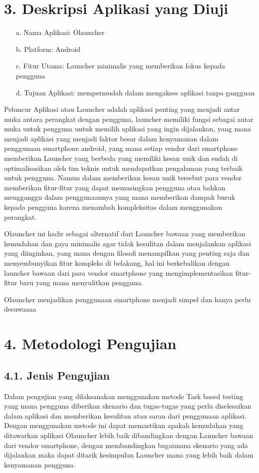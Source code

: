 \section*{3. Deskripsi Aplikasi yang Diuji}

\begin{itemize}[leftmargin=*]
\item[a.] Nama Aplikasi: Olauncher
\item[b.] Platform: Android
\item[c.] Fitur Utama: Launcher minimalis yang memberikan fokus kepada pengguna
\item[d.] Tujuan Aplikasi: mempermudah dalam mengakses aplikasi tanpa gangguan
\end{itemize}

Peluncur Aplikasi atau Launcher adalah aplikasi penting yang menjadi antar muka antara perangkat dengan pengguna, launcher memiliki fungsi sebagai antar muka untuk pengguna untuk memilih aplikasi yang ingin dijalankan, yang mana menjadi aplikasi yang menjadi faktor besar dalam kenyamanan dalam penggunaan smartphone android, yang mana setiap vendor dari smartphone memberikan Launcher yang berbeda yang memiliki kesan unik dan sudah di optimalisasikan oleh tim teknis untuk mendapatkan pengalaman yang terbaik untuk pengguna. Namun dalam memberikan kesan unik tersebut para vendor memberikan fitur-fitur yang dapat memusingkan pengguna atau bahkan mengganggu dalam penggunaannya yang mana memberikan dampak buruk kepada pengguna karena menambah kompleksitas dalam menggunakan perangkat. 

Olauncher ini hadir sebagai alternatif dari Launcher bawaan yang memberikan kemudahan dan gaya minimalis agar tidak kesulitan dalam menjalankan aplikasi yang diinginkan, yang mana dengan filosofi menampilkan yang penting saja dan menyembunyikan fitur kompleks di belakang, hal ini berkebalikan dengan launcher bawaan dari para vendor smartphone yang mengimplementasikan fitur-fitur baru yang mana menyulitkan pengguna.

Olauncher menjadikan penggunaan smartphone menjadi simpel dan hanya perlu desuwaaaa


\section*{4. Metodologi Pengujian}
\subsection*{4.1. Jenis Pengujian}
Dalam pengujian yang dilaksanakan menggunakan metode Task based testing yang mana pengguna diberikan skenario dan tugas-tugas yang perlu diselesaikan dalam aplikasi dan memberikan kesulitan atau saran dari penggunaan aplikasi. 
  Dengan menggunakan metode ini dapat memastikan apakah kemudahan yang ditawarkan aplikasi Olauncher lebih baik dibandingkan dengan Launcher bawaan dari vendor smartphone, dengan membandingkan bagaimana skenario yang ada dijalankan maka dapat ditarik kesimpulan Launcher mana yang lebih baik dalam kenyamanan pengguna.
